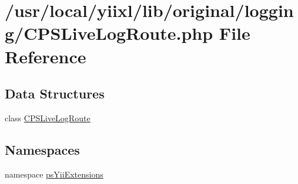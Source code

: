 \hypertarget{CPSLiveLogRoute_8php}{
\section{/usr/local/yiixl/lib/original/logging/CPSLiveLogRoute.php File Reference}
\label{CPSLiveLogRoute_8php}
}
\subsection*{Data Structures}
\begin{DoxyCompactItemize}
\item 
class \hyperlink{classCPSLiveLogRoute}{CPSLiveLogRoute}
\end{DoxyCompactItemize}
\subsection*{Namespaces}
\begin{DoxyCompactItemize}
\item 
namespace \hyperlink{namespacepsYiiExtensions}{psYiiExtensions}
\end{DoxyCompactItemize}
